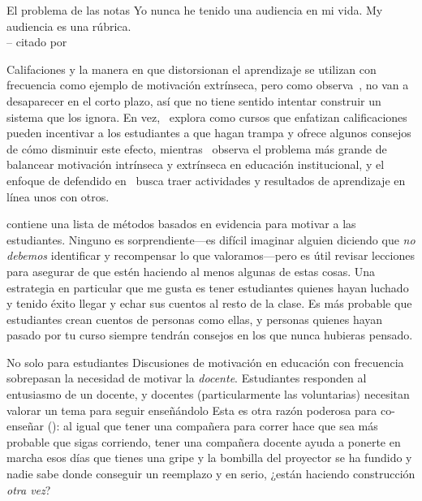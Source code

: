 \begin{aside}{El problema de las notas}
  Yo nunca he tenido una audiencia en mi vida. My audiencia es una rúbrica.\\
  -- citado por 

  Califaciones y la manera en que distorsionan el aprendizaje se utilizan con frecuencia como ejemplo de motivación extrínseca,
  pero como observa~\cite{Mill2016a},
  no van a desaparecer en el corto plazo,
  así que no tiene sentido intentar construir un sistema que los ignora.
  En vez,~\cite{Lang2013} explora como cursos que enfatizan calificaciones
  pueden incentivar a los estudiantes a que hagan trampa
  y ofrece algunos consejos de cómo disminuir este efecto,
  mientras~\cite{Covi2017} observa el problema más grande de
  balancear motivación intrínseca y extrínseca en educación institucional,
  y el enfoque de 
  defendido en~\cite{Bigg2011} busca traer actividades y resultados de aprendizaje en línea unos con otros.
\end{aside}

\cite{Ambr2010} contiene una lista de métodos basados en evidencia para motivar a las estudiantes.
Ninguno es sorprendiente---es
difícil imaginar alguien diciendo que \emph{no debemos} identificar y recompensar lo que valoramos---pero
es útil revisar lecciones para asegurar de que estén haciendo al menos algunas de estas cosas.
Una estrategia en particular que me gusta es
tener estudiantes quienes hayan luchado y tenido éxito
llegar y echar sus cuentos al resto de la clase.
Es más probable que estudiantes crean cuentos de personas como ellas,
y personas quienes hayan pasado por tu curso
siempre tendrán consejos en los que nunca hubieras pensado.

\begin{aside}{No solo para estudiantes}
  Discusiones de motivación en educación con frecuencia sobrepasan la necesidad de motivar la \emph{docente}.
  Estudiantes responden al entusiasmo de un docente,
  y docentes (particularmente las voluntarias) necesitan valorar un tema para seguir enseñándolo 
  Esta es otra razón poderosa para co-enseñar ():
  al igual que tener una compañera para correr hace que sea más probable que sigas corriendo,
  tener una compañera docente ayuda a ponerte en marcha
  esos días que tienes una gripe
  y la bombilla del proyector se ha fundido
  y nadie sabe donde conseguir un reemplazo
  y en serio,
  ¿están haciendo construcción \emph{otra vez}?
\end{aside}

